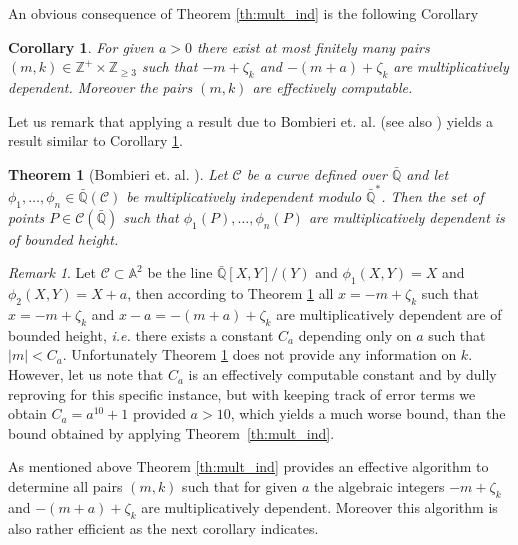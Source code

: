 \documentclass{amsart}
\theoremstyle{plain}
\numberwithin{equation}{section}
\newtheorem{theorem}[thm]{Theorem}
\newtheorem{cor}[thm]{Corollary}
\theoremstyle{remark}
\newtheorem{remark}{Remark}
\begin{document}
An obvious consequence of Theorem \ref{th:mult_ind} is the following Corollary

\begin{cor}\label{Cor:finite}
  For given $a>0$ there exist at most finitely many pairs $(m,k)\in
  {{\mathbb Z}}^+\times {{\mathbb Z}}_{\geq 3}$ such that $-m+\zeta_k$ and $-(m+a)+\zeta_k$ are
  multiplicatively dependent.  Moreover the pairs $(m,k)$ are
  effectively computable.
\end{cor}

Let us remark that applying a result due to Bombieri et. al. \cite[Theorem 1]{Bombieri:1999} (see also \cite[Theorem~3.22]{Zannier:LNDA}) yields 
a result similar to Corollary \ref{Cor:finite}.

\begin{theorem}[Bombieri et. al. \cite{Bombieri:1999}]\label{th:mult-general}
  Let $\mathcal C$ be a curve defined over $\bar{{\mathbb Q}}$ and let
  $\phi_1,\dots,\phi_n \in \bar{{\mathbb Q}}(\mathcal C)$ be multiplicatively
  independent modulo $\bar{{\mathbb Q}}^*$. Then the set of points $P\in \mathcal
  C (\bar {{\mathbb Q}})$ such that $\phi_1(P),\dots,\phi_n(P)$ are
  multiplicatively dependent is of bounded height.
\end{theorem}

\begin{remark} Let $\mathcal C\subset \mathbb A^2$ be the line $\bar{{\mathbb Q}}[X,Y]/(Y)$ and
$\phi_1(X,Y)=X$ and $\phi_2(X,Y)=X+a$, then according to Theorem
\ref{th:mult-general} all $x=-m+\zeta_k$ such that $x=-m+\zeta_k$ and
$x-a=-(m+a)+\zeta_k$ are multiplicatively dependent are of bounded
height, \textit{i.e.} there exists a constant $C_a$ depending only on $a$ such
that $|m|<C_a$. Unfortunately Theorem \ref{th:mult-general} does not
provide any information on $k$. However, let us note that $C_a$ is an
effectively computable constant and by dully reproving
\cite[Theorem 3.22]{Zannier:LNDA} for this specific instance, but with
keeping track of error terms we obtain $C_a=a^{10}+1$ provided $a>10$,
which yields a much worse bound, than the bound obtained by applying
Theorem~\ref{th:mult_ind}.
\end{remark}

As mentioned above Theorem \ref{th:mult_ind} provides an effective algorithm to determine all pairs $(m,k)$ such that for given 
$a$ the algebraic integers $-m+\zeta_k$ and $-(m+a)+\zeta_k$ are multiplicatively dependent. Moreover this algorithm is also rather efficient 
as the next corollary indicates.
\end{document}
